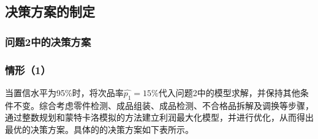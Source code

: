 \documentclass[withoutpreface,bwprint]{cumcmthesis} %
\begin{document}
\subsection{决策方案的制定}

\subsubsection{问题2中的决策方案}
\subsubsection*{情形（1）}
当置信水平为95\%时，将次品率$\hat{p_1}=15\%$代入问题2中的模型求解，并保持其他条件不变。综合考虑零件检测、成品组装、成品检测、不合格品拆解及调换等步骤，通过整数规划和蒙特卡洛模拟的方法建立利润最大化模型，并进行优化，从而得出最优的决策方案。具体的的决策方案如下表所示。
\end{document}
